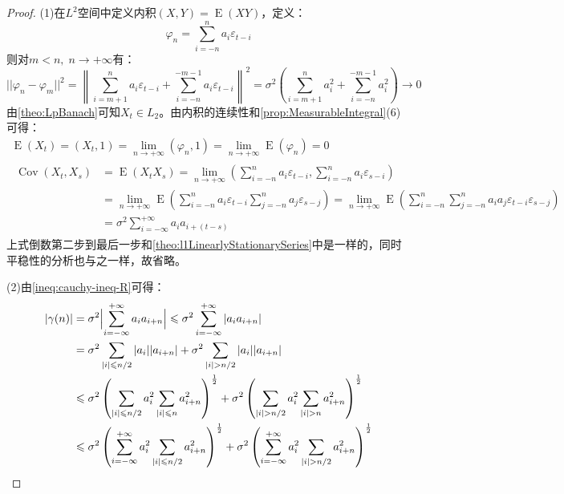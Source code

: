 \begin{proof}
	(1)在$L^2$空间中定义内积$(X,Y)=\operatorname{E}(XY)$，定义：
	\begin{equation*}
		\varphi_n=\sum_{i=-n}^{n}a_i\varepsilon_{t-i}
	\end{equation*}
	则对$m<n,\;n\to+\infty$有：
	\begin{equation*}
		||\varphi_n-\varphi_m||^2=\left\|\sum_{i=m+1}^{n}a_i\varepsilon_{t-i}+\sum_{i=-n}^{-m-1}a_i\varepsilon_{t-i}\right\|^2=\sigma^2\left(\sum_{i=m+1}^{n}a_i^2+\sum_{i=-n}^{-m-1}a_i^2\right)\to0
	\end{equation*}
	由\cref{theo:LpBanach}可知$X_t\in L_2$。由内积的连续性和\cref{prop:MeasurableIntegral}(6)可得：
	\begin{gather*}
		\operatorname{E}(X_t)=(X_t,1)=\lim_{n\to+\infty}(\varphi_n,1)=\lim_{n\to+\infty}\operatorname{E}(\varphi_n)=0 \\
		\begin{aligned}
			\operatorname{Cov}(X_t,X_s)&=\operatorname{E}(X_tX_s)=\lim_{n\to+\infty}\left(\sum_{i=-n}^{n}a_i\varepsilon_{t-i},\sum_{i=-n}^{n}a_i\varepsilon_{s-i}\right) \\
			&=\lim_{n\to+\infty}\operatorname{E}\left(\sum_{i=-n}^{n}a_i\varepsilon_{t-i}\sum_{j=-n}^{n}a_j\varepsilon_{s-j}\right)=\lim_{n\to+\infty}\operatorname{E}\left(\sum_{i=-n}^{n}\sum_{j=-n}^{n}a_ia_j\varepsilon_{t-i}\varepsilon_{s-j}\right) \\
			&=\sigma^2\sum_{i=-\infty}^{+\infty}a_ia_{i+(t-s)}
		\end{aligned}
	\end{gather*}
	上式倒数第二步到最后一步和\cref{theo:l1LinearlyStationarySeries}中是一样的，同时平稳性的分析也与之一样，故省略。\par
	(2)由\cref{ineq:cauchy-ineq-R}可得：
	\begin{align*}
		|\gamma(n)|
		&=\sigma^2\Bigl|\sum_{i=-\infty}^{+\infty}a_ia_{i+n}\Bigr| \leqslant\sigma^2\sum_{i=-\infty}^{+\infty}|a_ia_{i+n}| \\
		&=\sigma^2\sum_{|i|\leqslant n/2}|a_i||a_{i+n}|+\sigma^2\sum_{|i|> n/2}|a_i||a_{i+n}| \\
		&\leqslant\sigma^2\left(\sum_{|i|\leqslant n/2}a_i^2\sum_{|i|\leqslant n}a_{i+n}^2\right)^\frac{1}{2}+\sigma^2\left(\sum_{|i|>n/2}a_i^2\sum_{|i|>n}a_{i+n}^2\right)^\frac{1}{2} \\
		&\leqslant\sigma^2\left(\sum_{i=-\infty}^{+\infty}a_i^2\sum_{|i|\leqslant n/2}a_{i+n}^2\right)^\frac{1}{2}+\sigma^2\left(\sum_{i=-\infty}^{+\infty}a_i^2\sum_{|i|>n/2}a_{i+n}^2\right)^\frac{1}{2}

\end{align*}
\end{proof}

